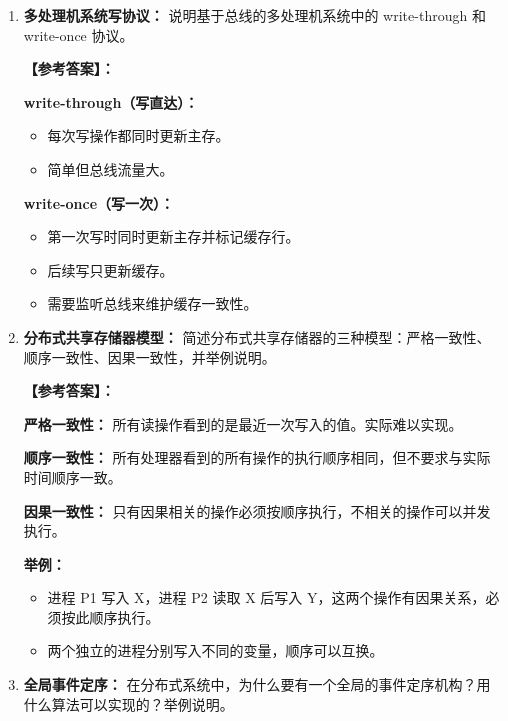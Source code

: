 \documentclass[a4paper,12pt]{article}
\newcommand{\answer}[1]{\par\vspace{0.5em}\hspace{2em}\textbf{【参考答案】：}\\{\color{blue}#1}\par\vspace{1em}}
\begin{document}
\begin{enumerate}[label=\arabic*.]
{    \textbf{写操作：}
    \begin{enumerate}[label=\arabic*.]
        \item 处理器发起写请求，包含目标地址和数据。
        \item 请求路由到目标存储器模块。
        \item 存储器模块更新数据并可能发送无效化或更新消息到其他缓存。
    \end{enumerate}
    }

    \item \textbf{多处理机系统写协议：}
    说明基于总线的多处理机系统中的 write-through 和 write-once 协议。
    
    \answer{
    \textbf{write-through（写直达）：}
    \begin{itemize}
        \item 每次写操作都同时更新主存。
        \item 简单但总线流量大。
    \end{itemize}
    
    \textbf{write-once（写一次）：}
    \begin{itemize}
        \item 第一次写时同时更新主存并标记缓存行。
        \item 后续写只更新缓存。
        \item 需要监听总线来维护缓存一致性。
    \end{itemize}
    }

    \item \textbf{分布式共享存储器模型：}
    简述分布式共享存储器的三种模型：严格一致性、顺序一致性、因果一致性，并举例说明。
    
    \answer{
    \textbf{严格一致性：} 所有读操作看到的是最近一次写入的值。实际难以实现。
    
    \textbf{顺序一致性：} 所有处理器看到的所有操作的执行顺序相同，但不要求与实际时间顺序一致。
    
    \textbf{因果一致性：} 只有因果相关的操作必须按顺序执行，不相关的操作可以并发执行。
    
    \textbf{举例：}
    \begin{itemize}
        \item 进程 P1 写入 X，进程 P2 读取 X 后写入 Y，这两个操作有因果关系，必须按此顺序执行。
        \item 两个独立的进程分别写入不同的变量，顺序可以互换。
    \end{itemize}
    }

    \item \textbf{全局事件定序：}
    在分布式系统中，为什么要有一个全局的事件定序机构？用什么算法可以实现的？举例说明。
    

\end{enumerate}
\end{document}
